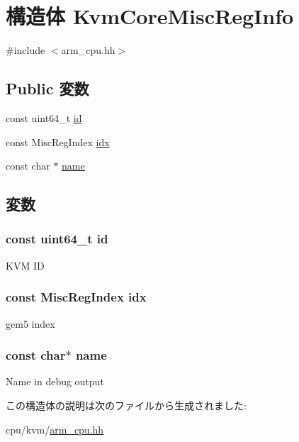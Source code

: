 \hypertarget{structArmKvmCPU_1_1KvmCoreMiscRegInfo}{
\section{構造体 KvmCoreMiscRegInfo}
\label{structArmKvmCPU_1_1KvmCoreMiscRegInfo}
}


{\ttfamily \#include $<$arm\_\-cpu.hh$>$}\subsection*{Public 変数}
\begin{DoxyCompactItemize}
\item 
const uint64\_\-t \hyperlink{structArmKvmCPU_1_1KvmCoreMiscRegInfo_a009b405b4dfece21e45ce92ab8d9adb0}{id}
\item 
const MiscRegIndex \hyperlink{structArmKvmCPU_1_1KvmCoreMiscRegInfo_afa584fd02db7014ce9b08f15da2d84b9}{idx}
\item 
const char $\ast$ \hyperlink{structArmKvmCPU_1_1KvmCoreMiscRegInfo_a8f8f80d37794cde9472343e4487ba3eb}{name}
\end{DoxyCompactItemize}


\subsection{変数}
\hypertarget{structArmKvmCPU_1_1KvmCoreMiscRegInfo_a009b405b4dfece21e45ce92ab8d9adb0}{
\subsubsection[{id}]{\setlength{\rightskip}{0pt plus 5cm}const uint64\_\-t {\bf id}}}
\label{structArmKvmCPU_1_1KvmCoreMiscRegInfo_a009b405b4dfece21e45ce92ab8d9adb0}
KVM ID \hypertarget{structArmKvmCPU_1_1KvmCoreMiscRegInfo_afa584fd02db7014ce9b08f15da2d84b9}{
\subsubsection[{idx}]{\setlength{\rightskip}{0pt plus 5cm}const MiscRegIndex {\bf idx}}}
\label{structArmKvmCPU_1_1KvmCoreMiscRegInfo_afa584fd02db7014ce9b08f15da2d84b9}
gem5 index \hypertarget{structArmKvmCPU_1_1KvmCoreMiscRegInfo_a8f8f80d37794cde9472343e4487ba3eb}{
\subsubsection[{name}]{\setlength{\rightskip}{0pt plus 5cm}const char$\ast$ {\bf name}}}
\label{structArmKvmCPU_1_1KvmCoreMiscRegInfo_a8f8f80d37794cde9472343e4487ba3eb}
Name in debug output 

この構造体の説明は次のファイルから生成されました:\begin{DoxyCompactItemize}
\item 
cpu/kvm/\hyperlink{arm__cpu_8hh}{arm\_\-cpu.hh}\end{DoxyCompactItemize}
